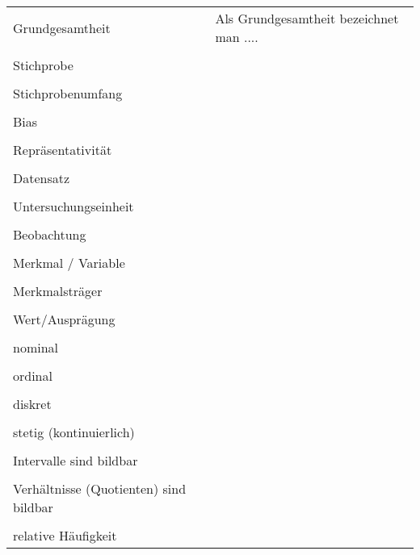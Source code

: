 \begin{tabular}{p{5cm}|l}
  Grundgesamtheit         &  Als Grundgesamtheit bezeichnet man ....\\
  \\
  Stichprobe\index{Stichprobe}              & \\
  \\
  Stichprobenumfang       & \\
  \\
  Bias\index{Bias}                   & \\
  \\ 
  Repräsentativität       & \\
  \\
  Datensatz\index{Datensatz}               & \\
  \\
  Untersuchungseinheit\index{Untersuchungseinheit}    & \\
  \\
  Beobachtung             & \\
  \\
  Merkmal\index{Merkmal} / Variable      & \\
  \\
  Merkmalsträger\index{Merkmalsträger}          & \\
  \\
  Wert/Ausprägung         & \\
  \\
  nominal\index{nominal}                 & \\
  \\
  ordinal\index{ordinal}                 & \\
  \\
  diskret\index{diskret}                 & \\
  \\
  stetig (kontinuierlich) & \\
  \\
  Intervalle\index{Intervalle} sind bildbar & \\
  \\
  Verhältnisse\index{Verhältnisse!bildbar} (Quotienten) sind bildbar & \\
  \\ 
  relative Häufigkeit\index{Häufigkeit!relative}     & \\
\end{tabular}%
\newpage


